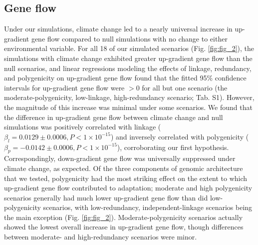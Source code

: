 \documentclass[9pt,twocolumn,twoside,lineno]{pnas-new}
\begin{document}
\subsection{Gene flow}
Under our simulations, climate change led to a nearly universal increase in up-gradient gene flow
compared to null simulations with no change to either environmental variable. For all 18 of our simulated scenarios (Fig. \ref{fig:fig_2}), the simulations with climate change exhibited greater up-gradient gene flow than the null scenarios, and linear regressions modeling the effects of linkage, redundancy, and polygenicity on up-gradient gene flow found that the 
fitted 95\% confidence intervals for up-gradient gene flow were $>0$ for all but
one scenario (the moderate-polygenicity, low-linkage, high-redundancy scenario; Tab. S1).
However, the magnitude of this increase was minimal under
some scenarios. We found that the difference in up-gradient gene flow between climate change and null simulations was positively correlated with linkage
($\beta_{l} = 0.0129\pm0.0006, P<1\times10^{-15}$)
and inversely correlated with polygenicity
($\beta_{p} = -0.0142\pm0.0006, P<1\times10^{-15}$),
corroborating our first hypothesis.
Correspondingly, down-gradient gene flow was 
universally suppressed under climate change, as expected.
Of the three components of genomic architecture that we tested,
polygenicity had the most striking effect on the extent to which
up-gradient gene flow contributed to adaptation;
moderate and high polygenicity scenarios generally had much lower
up-gradient gene flow than did low-polygenicity scenarios,
with low-redundancy, independent-linkage scenarios being the main exception (Fig. \ref{fig:fig_2}).
Moderate-polygenicity scenarios actually showed the lowest overall increase
in up-gradient gene flow, though differences between moderate- and
high-redundancy scenarios were minor.
\end{document}
